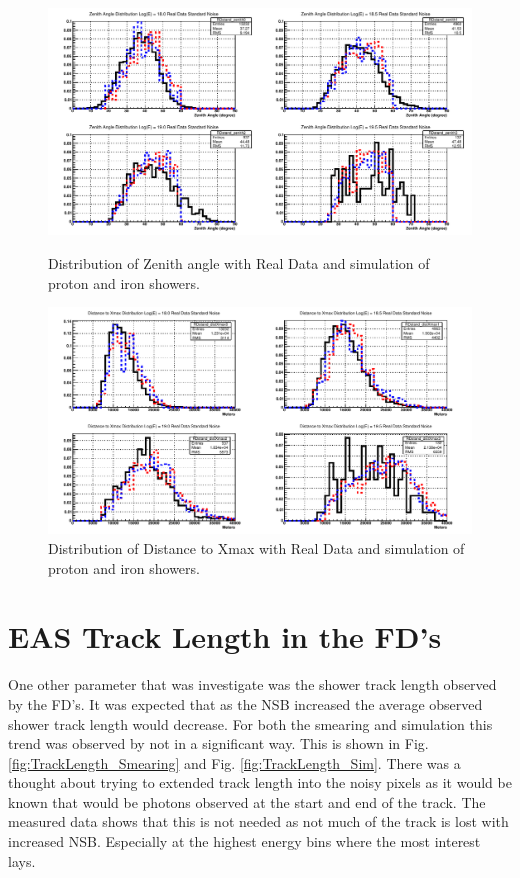 \begin{figure}
\centering
\includegraphics[width=\textwidth]{chapters/graphs/SelectionEff/RealDataAndSim_ZenithDistComp.pdf}
\caption{Distribution of Zenith angle with Real Data and simulation of proton and iron showers.}
\vspace{3mm}
\includegraphics[width=\textwidth]{chapters/graphs/SelectionEff/RealDataAndSim_DistToXmaxDistComp.pdf}
\caption{Distribution of Distance to Xmax with Real Data and simulation of proton and iron showers.}
\end{figure}

\section{EAS Track Length in the FD's}

One other parameter that was investigate was the shower track length observed by the FD's. It was expected that as the NSB increased the average observed shower track length would decrease. For both the smearing and simulation this trend was observed by not in a significant way. This is shown in Fig. \ref{fig:TrackLength_Smearing} and Fig. \ref{fig:TrackLength_Sim}.  There was a thought about trying to extended track length into the noisy pixels as it would be known that would be photons observed at the start and end of the track. The measured data shows that this is not needed as not much of the track is lost with increased NSB. Especially at the highest energy bins where the most interest lays. 

